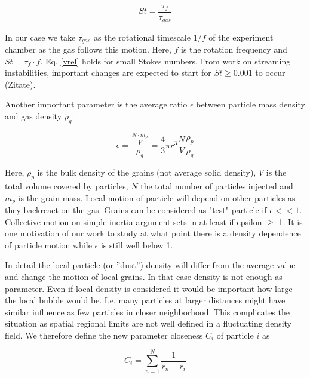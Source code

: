 \begin{equation}
St = \frac{\tau_f}{\tau_{gas}}
\end{equation}

In our case we take $\tau_{gas}$ as the rotational timescale $1/f$ of the experiment chamber as the gas follows this motion. Here, $f$ is the rotation frequency
and $St = \tau_f \cdot f$. Eq. \ref{vrel} holds for small Stokes numbers. From work on
streaming instabilities, important
changes are expected to start for  $St \geq 0.001$ to occur (Zitate).


Another important parameter is the average ratio $\epsilon$ between particle mass density and gas density $\rho_g$.

\begin{equation}
\epsilon = \frac{\frac{N \cdot m_p}{V}}{\rho_g} = \frac{4}{3} \pi r^3 \frac{N}{V} \frac{\rho_p}{\rho_g}
\end{equation}
 
Here, $\rho_p$ is the bulk density of the grains (not average solid density), $V$ is the total volume covered by particles, $N$ the total number of particles injected and $m_p$ is the grain mass.
Local motion of particle will depend on other particles as they backreact on the gas. 
Grains can be considered as "test" particle if $\epsilon << 1$. 
Collective motion on simple inertia argument sets in at least if epsilon $\geq$ 1.
It is one motivation of our work to study at what point there is a density dependence of particle motion while $\epsilon$ is still well below 1.

In detail the local particle (or ''dust'') density will differ from the average value and  change the motion of local grains. In that case density is not enough as parameter. Even if local density is considered it would be important how large the local bubble would be. I.e. many particles at larger distances might have similar influence as
few particles in closer neighborhood. This complicates the situation as spatial regional limits are not well defined in a fluctuating density field. We therefore define the new parameter closeness $C_i$ of particle $i$ as

\begin{equation}
C_i = \sum_{n=1}^N \frac{1}{r_n-r_i}
\end{equation}

